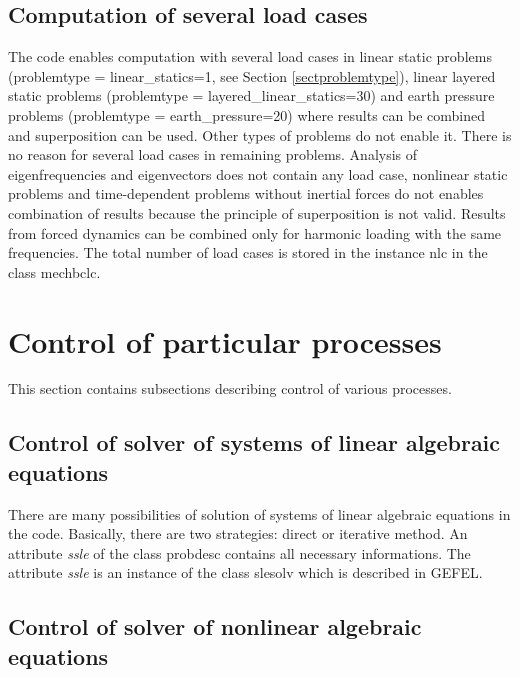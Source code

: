 \subsection{Computation of several load cases}
The code enables computation with several load cases in linear static problems (problemtype = linear\_statics=1,
see Section \ref{sectproblemtype}), linear layered static problems (problemtype = layered\_linear\_statics=30)
and earth pressure problems (problemtype = earth\_pressure=20) where results can be combined and superposition can be used.
Other types of problems do not enable it. There is no reason for several
load cases in remaining problems. Analysis of eigenfrequencies and eigenvectors does not contain
any load case, nonlinear static problems and time-dependent problems without inertial forces do not enables
combination of results because the principle of superposition is not valid. Results from forced dynamics
can be combined only for harmonic loading with the same frequencies.
The total number of load cases is stored in the instance nlc in the class mechbclc.

\section{Control of particular processes}

This section contains subsections describing control of various processes.

\subsection{Control of solver of systems of linear algebraic equations}
\label{sectcontrlineqsolver}

There are many possibilities of solution of systems of linear algebraic equations in the code. Basically,
there are two strategies: direct or iterative method. An attribute {\it ssle} of the class {\sf probdesc}
contains all necessary informations. The attribute {\it ssle} is an instance of the class {\sf slesolv} which
is described in GEFEL.

\subsection{Control of solver of nonlinear algebraic equations}


